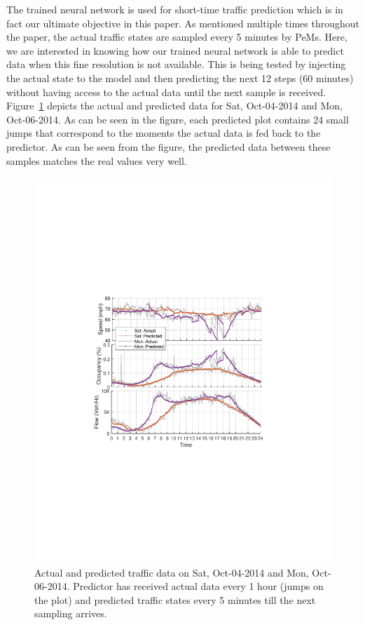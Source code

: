 \documentclass[twocolumn,10pt]{asme2e}
\begin{document}
The trained neural network is used for short-time traffic prediction which is in fact our ultimate objective in this paper. As mentioned multiple times throughout the paper, the actual traffic states are sampled every 5 minutes by PeMs. Here, we are interested in knowing how our trained neural network is able to predict data when this fine resolution is not available. This is being tested by injecting the actual state to the model and then predicting the next 12 steps (60 minutes) without having access to the actual data until the next sample is received. Figure~\ref{fig:final1} depicts the actual and predicted data for Sat, Oct-04-2014 and Mon, Oct-06-2014. As can be seen in the figure, each predicted plot contains 24 small jumps that correspond to the moments the actual data is fed back to the predictor. As can be seen from the figure, the predicted data between these samples matches the real values very well.
\begin{figure}[t]
	\centering
	\includegraphics[width=1\linewidth]{./Figures/final1}
	\caption{Actual and predicted traffic data on Sat, Oct-04-2014 and Mon, Oct-06-2014. Predictor has received actual data every 1 hour (jumps on the plot) and predicted traffic states every 5 minutes till the next sampling arrives.}
	\label{fig:final1}
\end{figure}
\end{document}

